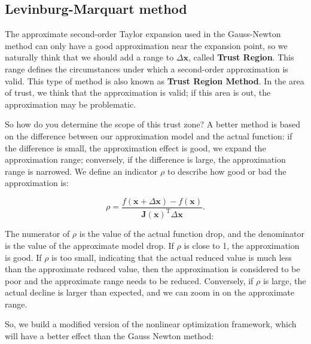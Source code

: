 \subsection{Levinburg-Marquart method}

The approximate second-order Taylor expansion used in the Gauss-Newton method can only have a good approximation near the expansion point, so we naturally think that we should add a range to $\Delta \bm{x}$, called \textbf{ Trust Region}. This range defines the circumstances under which a second-order approximation is valid. This type of method is also known as \textbf{Trust Region Method}. In the area of trust, we think that the approximation is valid; if this area is out, the approximation may be problematic.

So how do you determine the scope of this trust zone? A better method is based on the difference between our approximation model and the actual function: if the difference is small, the approximation effect is good, we expand the approximation range; conversely, if the difference is large, the approximation range is narrowed. We define an indicator $\rho$ to describe how good or bad the approximation is:

\begin{equation}\label{eq:6.24}
\rho  = \frac{{f\left( {\bm{x} + \Delta \bm{x}} \right)}  - {{ {f\left( \bm{x} \right)} }}}{ \bm{J}\left( \bm{x} \right)^\mathrm{T} \Delta \bm{x} } .
\end{equation}

The numerator of $\rho$ is the value of the actual function drop, and the denominator is the value of the approximate model drop. If $\rho$ is close to 1, the approximation is good. If $\rho$ is too small, indicating that the actual reduced value is much less than the approximate reduced value, then the approximation is considered to be poor and the approximate range needs to be reduced. Conversely, if $\rho$ is large, the actual decline is larger than expected, and we can zoom in on the approximate range.

So, we build a modified version of the nonlinear optimization framework, which will have a better effect than the Gauss Newton method:

